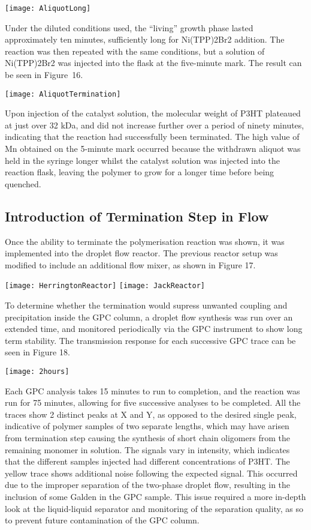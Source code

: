 \texttt{[image: AliquotLong]}

Under the diluted conditions used, the “living” growth phase lasted approximately ten minutes, sufficiently long for Ni(TPP)2Br2 addition. The reaction was then repeated with the same conditions, but a solution of Ni(TPP)2Br2 was injected into the flask at the five-minute mark. The result can be seen in Figure 16.

\texttt{[image: AliquotTermination]}

Upon injection of the catalyst solution, the molecular weight of P3HT plateaued at just over 32 kDa, and did not increase further over a period of ninety minutes, indicating that the reaction had successfully been terminated. The high value of Mn obtained on the 5-minute mark occurred because the withdrawn aliquot was held in the syringe longer whilst the catalyst solution was injected into the reaction flask, leaving the polymer to grow for a longer time before being quenched.

\subsection{Introduction of Termination Step in Flow}

Once the ability to terminate the polymerisation reaction was shown, it was implemented into the droplet flow reactor. The previous reactor setup was modified to include an additional flow mixer, as shown in Figure 17.

\texttt{[image: HerringtonReactor]}
\texttt{[image: JackReactor]}

To determine whether the termination would supress unwanted coupling and precipitation inside the GPC column, a droplet flow synthesis was run over an extended time, and monitored periodically via the GPC instrument to show long term stability. The transmission response for each successive GPC trace can be seen in Figure 18.

\texttt{[image: 2hours]}

Each GPC analysis takes 15 minutes to run to completion, and the reaction was run for 75 minutes, allowing for five successive analyses to be completed. All the traces show 2 distinct peaks at X and Y, as opposed to the desired single peak, indicative of polymer samples of two separate lengths, which may have arisen from termination step causing the synthesis of short chain oligomers from the remaining monomer in solution. The signals vary in intensity, which indicates that the different samples injected had different concentrations of P3HT. The yellow trace shows additional noise following the expected signal. This occurred due to the improper separation of the two-phase droplet flow, resulting in the inclusion of some Galden in the GPC sample. This issue required a more in-depth look at the liquid-liquid separator and monitoring of the separation quality, as so to prevent future contamination of the GPC column.

